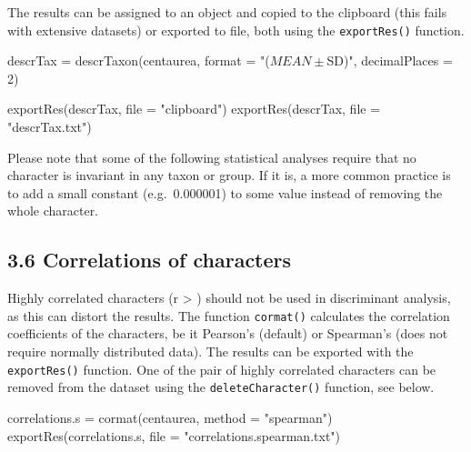 \documentclass[
  11pt,
  a4paper]{article}
\newenvironment{Shaded}{\begin{snugshade}}{\end{snugshade}}
\newcommand{\AttributeTok}[1]{\textcolor[rgb]{0.77,0.63,0.00}{#1}}
\newcommand{\DecValTok}[1]{\textcolor[rgb]{0.00,0.00,0.81}{#1}}
\newcommand{\FunctionTok}[1]{\textcolor[rgb]{0.00,0.00,0.00}{#1}}
\newcommand{\NormalTok}[1]{#1}
\newcommand{\OtherTok}[1]{\textcolor[rgb]{0.56,0.35,0.01}{#1}}
\newcommand{\StringTok}[1]{\textcolor[rgb]{0.31,0.60,0.02}{#1}}
\begin{document}
The results can be assigned to an object and copied to the clipboard
(this fails with extensive datasets) or exported to file, both using the
\texttt{exportRes()} function.

\begin{Shaded}
\begin{Highlighting}[]
\NormalTok{descrTax }\OtherTok{=} \FunctionTok{descrTaxon}\NormalTok{(centaurea, }\AttributeTok{format =} \StringTok{"($MEAN ± $SD)"}\NormalTok{, }\AttributeTok{decimalPlaces =} \DecValTok{2}\NormalTok{)}

\FunctionTok{exportRes}\NormalTok{(descrTax, }\AttributeTok{file =} \StringTok{"clipboard"}\NormalTok{)}
\FunctionTok{exportRes}\NormalTok{(descrTax, }\AttributeTok{file =} \StringTok{"descrTax.txt"}\NormalTok{)}
\end{Highlighting}
\end{Shaded}

Please note that some of the following statistical analyses require that
no character is invariant in any taxon or group. If it is, a more common
practice is to add a small constant (e.g.~0.000001) to some value
instead of removing the whole character.

\hypertarget{correlations-of-characters}{%
\subsection{3.6 Correlations of
characters}\label{correlations-of-characters}}

Highly correlated characters (r \textgreater{} \textbar)
should not be used in discriminant analysis, as this can distort the
results. The function \texttt{cormat()} calculates the correlation
coefficients of the characters, be it Pearson's (default) or Spearman's
(does not require normally distributed data). The results can be
exported with the \texttt{exportRes()} function. One of the pair of
highly correlated characters can be removed from the dataset using the
\texttt{deleteCharacter()} function, see below.

\begin{Shaded}
\begin{Highlighting}[]
\NormalTok{correlations.s }\OtherTok{=} \FunctionTok{cormat}\NormalTok{(centaurea, }\AttributeTok{method =} \StringTok{"spearman"}\NormalTok{)}
\FunctionTok{exportRes}\NormalTok{(correlations.s, }\AttributeTok{file =} \StringTok{"correlations.spearman.txt"}\NormalTok{)}
\end{Highlighting}
\end{Shaded}
\end{document}
